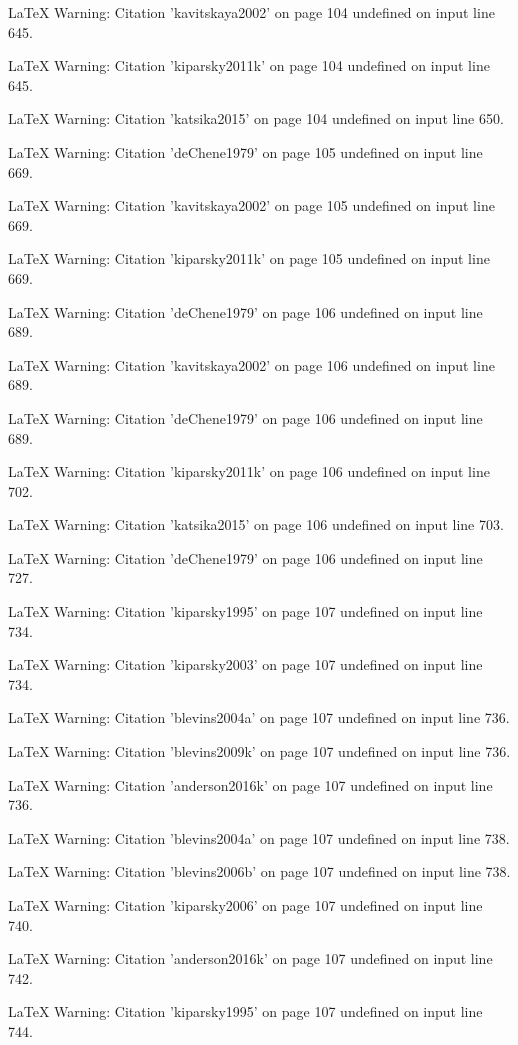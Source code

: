 LaTeX Warning: Citation 'kavitskaya2002' on page 104 undefined on input line 645.


LaTeX Warning: Citation 'kiparsky2011k' on page 104 undefined on input line 645.


LaTeX Warning: Citation 'katsika2015' on page 104 undefined on input line 650.


LaTeX Warning: Citation 'deChene1979' on page 105 undefined on input line 669.


LaTeX Warning: Citation 'kavitskaya2002' on page 105 undefined on input line 669.


LaTeX Warning: Citation 'kiparsky2011k' on page 105 undefined on input line 669.


LaTeX Warning: Citation 'deChene1979' on page 106 undefined on input line 689.


LaTeX Warning: Citation 'kavitskaya2002' on page 106 undefined on input line 689.


LaTeX Warning: Citation 'deChene1979' on page 106 undefined on input line 689.


LaTeX Warning: Citation 'kiparsky2011k' on page 106 undefined on input line 702.


LaTeX Warning: Citation 'katsika2015' on page 106 undefined on input line 703.


LaTeX Warning: Citation 'deChene1979' on page 106 undefined on input line 727.


LaTeX Warning: Citation 'kiparsky1995' on page 107 undefined on input line 734.


LaTeX Warning: Citation 'kiparsky2003' on page 107 undefined on input line 734.


LaTeX Warning: Citation 'blevins2004a' on page 107 undefined on input line 736.


LaTeX Warning: Citation 'blevins2009k' on page 107 undefined on input line 736.


LaTeX Warning: Citation 'anderson2016k' on page 107 undefined on input line 736.


LaTeX Warning: Citation 'blevins2004a' on page 107 undefined on input line 738.


LaTeX Warning: Citation 'blevins2006b' on page 107 undefined on input line 738.


LaTeX Warning: Citation 'kiparsky2006' on page 107 undefined on input line 740.


LaTeX Warning: Citation 'anderson2016k' on page 107 undefined on input line 742.


LaTeX Warning: Citation 'kiparsky1995' on page 107 undefined on input line 744.


